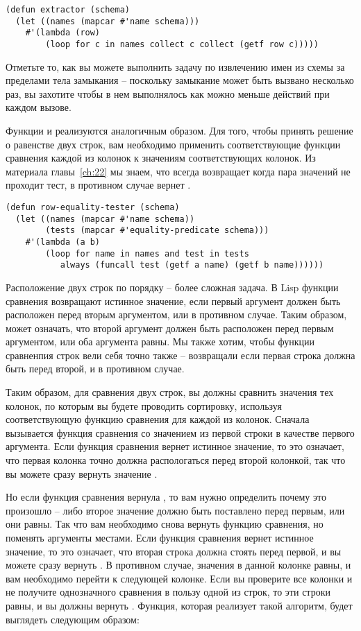 \begin{lstlisting}
(defun extractor (schema)
  (let ((names (mapcar #'name schema)))
    #'(lambda (row)
        (loop for c in names collect c collect (getf row c)))))
\end{lstlisting}

Отметьте то, как вы можете выполнить задачу по извлечению имен из схемы за пределами тела
замыкания -- поскольку замыкание может быть вызвано несколько раз, вы захотите чтобы в нем
выполнялось как можно меньше действий при каждом вызове.

Функции  и  реализуются аналогичным
образом.  Для того, чтобы принять решение о равенстве двух строк, вам необходимо применить
соответствующие функции сравнения каждой из колонок к значениям соответствующих колонок.
Из материала главы~\ref{ch:22} мы знаем, что  всегда возвращает 
когда пара значений не проходит тест, в противном случае  вернет .

\begin{lstlisting}
(defun row-equality-tester (schema)
  (let ((names (mapcar #'name schema))
        (tests (mapcar #'equality-predicate schema)))
    #'(lambda (a b)
        (loop for name in names and test in tests
           always (funcall test (getf a name) (getf b name))))))
\end{lstlisting}

Расположение двух строк по порядку -- более сложная задача.  В Lisp функции сравнения
возвращают истинное значение, если первый аргумент должен быть расположен перед вторым
аргументом, или  в противном случае.  Таким образом,  может означать,
что второй аргумент должен быть расположен перед первым аргументом, или оба аргумента
равны. Мы также хотим, чтобы функции сравненпия строк вели себя точно также -- возвращали
 если первая строка должна быть перед второй, и  в противном случае.

Таким образом, для сравнения двух строк, вы должны сравнить значения тех колонок, по
которым вы будете проводить сортировку, используя соответствующую функцию сравнения для
каждой из колонок.  Сначала вызывается функция сравнения со значением из первой строки в
качестве первого аргумента.  Если функция сравнения вернет истинное значение, то это
означает, что первая колонка точно должна распологаться перед второй колонкой, так что вы
можете сразу вернуть значение .

Но если функция сравнения вернула , то вам нужно определить почему это произошло
-- либо второе значение должно быть поставлено перед первым, или они равны.  Так что вам
необходимо снова вернуть функцию сравнения, но поменять аргументы местами.  Если функция
сравнения вернет истинное значение, то это означает, что вторая строка должна стоять перед
первой, и вы можете сразу вернуть .  В противном случае, значения в данной
колонке равны, и вам необходимо перейти к следующей колонке.  Если вы проверите все
колонки и не получите однозначного сравнения в пользу одной из строк, то эти строки равны,
и вы должны вернуть .  Функция, которая реализует такой алгоритм, будет
выглядеть следующим образом:

